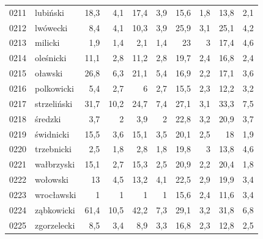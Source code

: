 \begin{center}
\begin{longtable}{lp{3cm}rrrrrrrr}
0211 & lubiński                & 18,3    & 4,1         & 17,4     & 3,9          & 15,6     & 1,8          & 13,8     & 2,1          \\
0212 & lwówecki                & 8,4     & 4,1         & 10,3     & 3,9          & 25,9     & 3,1          & 25,1     & 4,2          \\
0213 & milicki                 & 1,9     & 1,4         & 2,1      & 1,4          & 23       & 3            & 17,4     & 4,6          \\
0214 & oleśnicki               & 11,1    & 2,8         & 11,2     & 2,8          & 19,7     & 2,4          & 16,8     & 2,4          \\
0215 & oławski                 & 26,8    & 6,3         & 21,1     & 5,4          & 16,9     & 2,2          & 17,1     & 3,6          \\
0216 & polkowicki              & 5,4     & 2,7         & 6        & 2,7          & 15,5     & 2,3          & 12,2     & 3,2          \\
0217 & strzeliński             & 31,7    & 10,2        & 24,7     & 7,4          & 27,1     & 3,1          & 33,3     & 7,5          \\
0218 & średzki                 & 3,7     & 2           & 3,9      & 2            & 22,8     & 3,2          & 20,9     & 3,7          \\
0219 & świdnicki               & 15,5    & 3,6         & 15,1     & 3,5          & 20,1     & 2,5          & 18       & 1,9          \\
0220 & trzebnicki              & 2,5     & 1,8         & 2,8      & 1,8          & 19,8     & 3            & 13,8     & 4,6          \\
0221 & wałbrzyski              & 15,1    & 2,7         & 15,3     & 2,5          & 20,9     & 2,2          & 20,4     & 1,8          \\
0222 & wołowski                & 13      & 4,5         & 13,2     & 4,1          & 22,5     & 2,9          & 19,9     & 3,4          \\
0223 & wrocławski              & 1       & 1           & 1        & 1            & 15,6     & 2,4          & 11,6     & 3,4          \\
0224 & ząbkowicki              & 61,4    & 10,5        & 42,2     & 7,3          & 29,1     & 3,2          & 31,8     & 6,8          \\
0225 & zgorzelecki             & 8,5     & 3,4         & 8,9      & 3,3          & 16,8     & 2,3          & 12,8     & 2,5          \\

\end{longtable}
\end{center}

